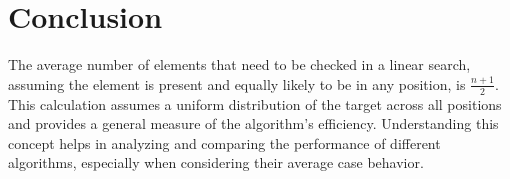 \documentclass{article}
\begin{document}
\section*{Conclusion}

The average number of elements that need to be checked in a linear search, assuming the element is present and equally likely to be in any position, is \( \frac{n + 1}{2} \). This calculation assumes a uniform distribution of the target across all positions and provides a general measure of the algorithm’s efficiency. Understanding this concept helps in analyzing and comparing the performance of different algorithms, especially when considering their average case behavior.
\end{document}

